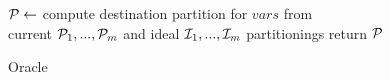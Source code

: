 \begin{algorithm}[t!]
\begin{distribalgo}[1]
		\STATE $\mathcal{P} \leftarrow$ compute destination partition for $vars$ from\\ \hspace{8mm}current $\mathcal{P}_1, ..., \mathcal{P}_m$ and ideal $\mathcal{I}_1, ..., \mathcal{I}_m$ partitionings
		\STATE return $\mathcal{P}$
	\ENDINDENT	
	
%        


\caption{Oracle}
\label{alg:oracle_proxy}
\end{distribalgo}
\end{algorithm}
